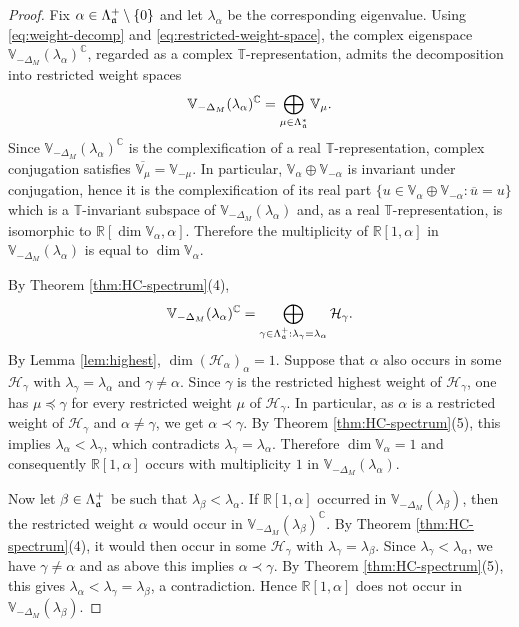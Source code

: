 \documentclass[reqno,twoside,12pt]{amsart}
\newcommand{\bC}{\mathbb{C}}
\newcommand{\bR}{\mathbb{R}}
\newcommand{\bT}{\mathbb{T}}
\newcommand{\bV}{\mathbb{V}}
\newcommand{\cH}{\mathcal{H}}
\numberwithin{equation}{section} \errorcontextlines=0
\begin{document}
\begin{proof}
Fix $\alpha\in\Lambda_{\frak a}^+\setminus\{0\}$ and let $\lambda_\alpha$ be the corresponding eigenvalue. Using \eqref{eq:weight-decomp} and \eqref{eq:restricted-weight-space}, the complex eigenspace $\bV_{-\Delta_M}(\lambda_\alpha)^\bC$, regarded as a complex $\bT$-representation, admits the decomposition into restricted weight spaces
\[
\bV_{-\Delta_M}(\lambda_\alpha)^\bC=\bigoplus_{\mu\in \Lambda_{\frak a}^*}\bV_\mu.
\]
Since $\bV_{-\Delta_M}(\lambda_\alpha)^\bC$ is the complexification of a real $\bT$-representation, complex conjugation satisfies $\overline{\bV_\mu}=\bV_{-\mu}$. In particular, $\bV_\alpha\oplus\bV_{-\alpha}$ is invariant under conjugation, hence it is the complexification of its real part
$
\{u\in \bV_\alpha\oplus\bV_{-\alpha}:\overline u=u\}
$
which is a $\bT$-invariant subspace of $\bV_{-\Delta_M}(\lambda_\alpha)$ and, as a real $\bT$-representation, is isomorphic to $\bR[\dim\bV_\alpha,\alpha]$. Therefore the multiplicity of $\bR[1,\alpha]$ in $\bV_{-\Delta_M}(\lambda_\alpha)$ is equal to $\dim\bV_\alpha$.

By Theorem \ref{thm:HC-spectrum}(4),
\[
\bV_{-\Delta_M}(\lambda_\alpha)^\bC=\bigoplus_{\gamma\in\Lambda_{\frak a}^+:\lambda_\gamma=\lambda_\alpha}\cH_\gamma.
\]
By Lemma \ref{lem:highest}, $\dim(\cH_\alpha)_\alpha=1$. Suppose that $\alpha$ also occurs in some $\cH_\gamma$ with $\lambda_\gamma=\lambda_\alpha$ and $\gamma\neq\alpha$. Since $\gamma$ is the restricted highest weight of $\cH_\gamma$, one has $\mu\preceq\gamma$ for every restricted weight $\mu$ of $\cH_\gamma$. In particular, as $\alpha$ is a restricted weight of $\cH_\gamma$ and $\alpha\neq\gamma$, we get $\alpha\prec\gamma$. By Theorem \ref{thm:HC-spectrum}(5), this implies $\lambda_\alpha<\lambda_\gamma$, which contradicts $\lambda_\gamma=\lambda_\alpha$. Therefore $\dim\bV_\alpha=1$ and consequently $\bR[1,\alpha]$ occurs with multiplicity $1$ in $\bV_{-\Delta_M}(\lambda_\alpha)$.

Now let $\beta\in\Lambda_{\frak a}^+$ be such that $\lambda_\beta<\lambda_\alpha$. If $\bR[1,\alpha]$ occurred in $\bV_{-\Delta_M}(\lambda_\beta)$, then the restricted weight $\alpha$ would occur in $\bV_{-\Delta_M}(\lambda_\beta)^\bC$. By Theorem \ref{thm:HC-spectrum}(4), it would then occur in some $\cH_\gamma$ with $\lambda_\gamma=\lambda_\beta$. Since $\lambda_\gamma<\lambda_\alpha$, we have $\gamma\neq\alpha$ and as above this implies $\alpha\prec\gamma$. By Theorem \ref{thm:HC-spectrum}(5), this gives $\lambda_\alpha<\lambda_\gamma=\lambda_\beta$, a contradiction. Hence $\bR[1,\alpha]$ does not occur in $\bV_{-\Delta_M}(\lambda_\beta)$.
\end{proof}
\end{document}
